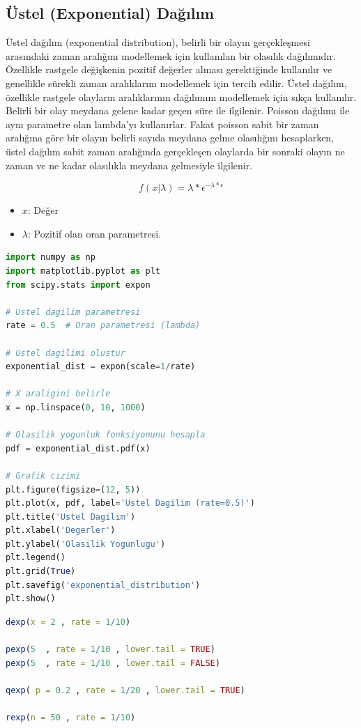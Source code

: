 \subsection{Üstel (Exponential) Dağılım}
Üstel dağılım (exponential distribution), belirli bir olayın gerçekleşmesi arasındaki zaman aralığını modellemek için kullanılan bir olasılık dağılımıdır. Özellikle rastgele değişkenin pozitif değerler alması gerektiğinde kullanılır ve genellikle sürekli zaman aralıklarını modellemek için tercih edilir. Üstel dağılım, özellikle rastgele olayların aralıklarının dağılımını modellemek için sıkça kullanılır. Belirli bir olay meydana gelene kadar geçen süre ile ilgilenir. Poisson dağılımı ile aynı parametre olan lambda'yı kullanırlar. Fakat poisson sabit bir zaman aralığına göre bir olayın belirli sayıda meydana gelme olasılığını hesaplarken, üstel dağılım sabit zaman aralığında gerçekleşen olaylarda bir sonraki olayın ne zaman ve ne kadar olasılıkla meydana gelmesiyle ilgilenir.

\[f(x | \lambda) = \lambda * \epsilon ^{-\lambda * \epsilon}\]
\begin{itemize}
	\item $x$: Değer
	\item $\lambda$: Pozitif olan oran parametresi.
\end{itemize}

\begin{lstlisting}[language=Python]
import numpy as np
import matplotlib.pyplot as plt
from scipy.stats import expon

# Ustel dagilim parametresi
rate = 0.5  # Oran parametresi (lambda)

# Ustel dagilimi olustur
exponential_dist = expon(scale=1/rate)

# X araligini belirle
x = np.linspace(0, 10, 1000)

# Olasilik yogunluk fonksiyonunu hesapla
pdf = exponential_dist.pdf(x)

# Grafik cizimi
plt.figure(figsize=(12, 5))
plt.plot(x, pdf, label='Ustel Dagilim (rate=0.5)')
plt.title('Ustel Dagilim')
plt.xlabel('Degerler')
plt.ylabel('Olasilik Yogunlugu')
plt.legend()
plt.grid(True)
plt.savefig('exponential_distribution')
plt.show()
\end{lstlisting}

\begin{lstlisting}[language=R]
dexp(x = 2 , rate = 1/10)

pexp(5  , rate = 1/10 , lower.tail = TRUE)
pexp(5  , rate = 1/10 , lower.tail = FALSE)

qexp( p = 0.2 , rate = 1/20 , lower.tail = TRUE)

rexp(n = 50 , rate = 1/10)
\end{lstlisting}

